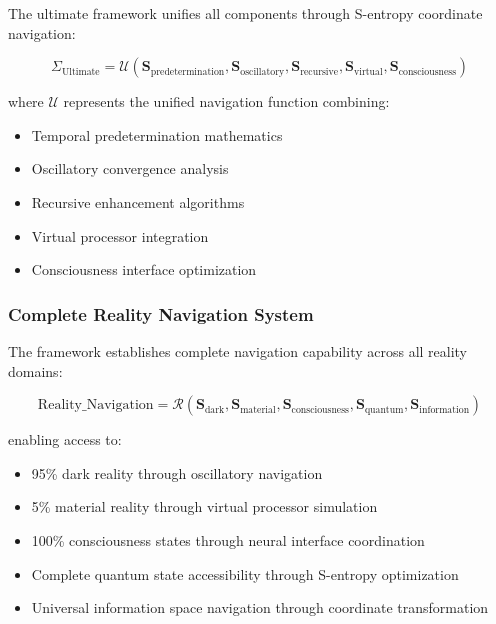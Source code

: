 \documentclass[12pt,a4paper]{article}
\begin{document}
{The ultimate framework unifies all components through S-entropy coordinate navigation:

\begin{equation}
\Sigma_{\text{Ultimate}} = \mathcal{U}(\mathbf{S}_{\text{predetermination}}, \mathbf{S}_{\text{oscillatory}}, \mathbf{S}_{\text{recursive}}, \mathbf{S}_{\text{virtual}}, \mathbf{S}_{\text{consciousness}})
\end{equation}

where $\mathcal{U}$ represents the unified navigation function combining:

\begin{itemize}
\item Temporal predetermination mathematics
\item Oscillatory convergence analysis
\item Recursive enhancement algorithms
\item Virtual processor integration
\item Consciousness interface optimization
\end{itemize}

\subsubsection{Complete Reality Navigation System}

The framework establishes complete navigation capability across all reality domains:

\begin{equation}
\text{Reality\_Navigation} = \mathcal{R}(\mathbf{S}_{\text{dark}}, \mathbf{S}_{\text{material}}, \mathbf{S}_{\text{consciousness}}, \mathbf{S}_{\text{quantum}}, \mathbf{S}_{\text{information}})
\end{equation}

enabling access to:

\begin{itemize}
\item 95\% dark reality through oscillatory navigation
\item 5\% material reality through virtual processor simulation
\item 100\% consciousness states through neural interface coordination
\item Complete quantum state accessibility through S-entropy optimization
\item Universal information space navigation through coordinate transformation
\end{itemize}

}
\end{document}

